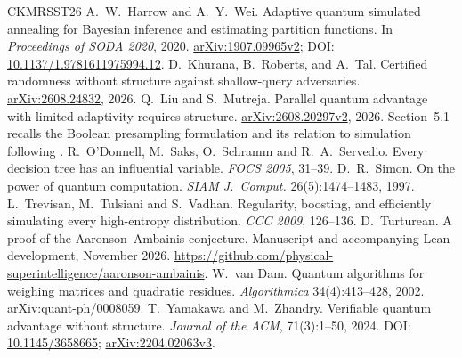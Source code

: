 \documentclass[11pt]{article}
\theoremstyle{definition}\newtheorem{definition}[theorem]{Definition}
\theoremstyle{remark}\newtheorem{remark}[theorem]{Remark}
\begin{document}
\begin{thebibliography}{CKMRSST26}
 A.~W.~Harrow and A.~Y.~Wei. Adaptive quantum simulated annealing for Bayesian inference and estimating partition functions. In \emph{Proceedings of SODA 2020}, 2020. \href{https://arxiv.org/abs/1907.09965v2}{arXiv:1907.09965v2}; DOI: \href{https://doi.org/10.1137/1.9781611975994.12}{10.1137/1.9781611975994.12}.
 D.~Khurana, B.~Roberts, and A.~Tal. Certified randomness without structure against shallow-query adversaries. \href{https://arxiv.org/abs/2608.24832}{arXiv:2608.24832}, 2026.
 Q.~Liu and S.~Mutreja. Parallel quantum advantage with limited adaptivity requires structure. \href{https://arxiv.org/abs/2608.20297v2}{arXiv:2608.20297v2}, 2026. Section~5.1 recalls the Boolean presampling formulation and its relation to simulation following \cite{GLLZ21}.
 R.~O'Donnell, M.~Saks, O.~Schramm and R.~A.~Servedio. Every decision tree has an influential variable. \emph{FOCS 2005}, 31--39.
 D.~R.~Simon. On the power of quantum computation. \emph{SIAM J.\ Comput.} 26(5):1474--1483, 1997.
 L.~Trevisan, M.~Tulsiani and S.~Vadhan. Regularity, boosting, and efficiently simulating every high-entropy distribution. \emph{CCC 2009}, 126--136.
 D.~Turturean. A proof of the Aaronson--Ambainis conjecture. Manuscript and accompanying Lean development, November 2026. \url{https://github.com/physical-superintelligence/aaronson-ambainis}.
 W.~van Dam. Quantum algorithms for weighing matrices and quadratic residues. \emph{Algorithmica} 34(4):413--428, 2002. arXiv:quant-ph/0008059.
 T.~Yamakawa and M.~Zhandry. Verifiable quantum advantage without structure. \emph{Journal of the ACM}, 71(3):1--50, 2024. DOI: \href{https://doi.org/10.1145/3658665}{10.1145/3658665}; \href{https://arxiv.org/abs/2204.02063v3}{arXiv:2204.02063v3}.
\end{thebibliography}

\appendix
\end{document}
